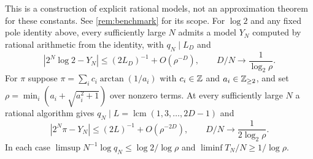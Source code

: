 \documentclass[11pt]{article}
\DeclareMathOperator{\lcm}{lcm}
\begin{document}
\begin{theorem}\label{th:legendre}
This is a construction of explicit rational models, not an approximation theorem for these constants. See \cref{rem:benchmark} for its scope.
For $\log 2$ and any fixed pole identity above, every sufficiently large $N$ admits a model $Y_N$ computed by rational arithmetic from the identity, with $q_N\mid L_D$ and
\[
 |2^N\log 2-Y_N|\le (2L_D)^{-1}+O(\rho^{-D}),
 \qquad D/N\longrightarrow\frac{1}{\log_2\rho}.
\]
For $\pi$ suppose $\pi=\sum_i c_i\arctan(1/a_i)$ with $c_i\in\mathbb Z$ and $a_i\in\mathbb Z_{\ge2}$, and set $\rho=\min_i(a_i+\sqrt{a_i^2+1})$ over nonzero terms. At every sufficiently large $N$ a rational algorithm gives $q_N\mid L=\lcm(1,3,\ldots,2D-1)$ and
\[
 |2^N\pi-Y_N|\le (2L)^{-1}+O(\rho^{-2D}),
 \qquad D/N\longrightarrow\frac{1}{2\log_2\rho}.
\]
In each case $\limsup N^{-1}\log q_N\le\log 2/\log\rho$ and $\liminf T_N/N\ge1/\log\rho$.
\end{theorem}
\end{document}
